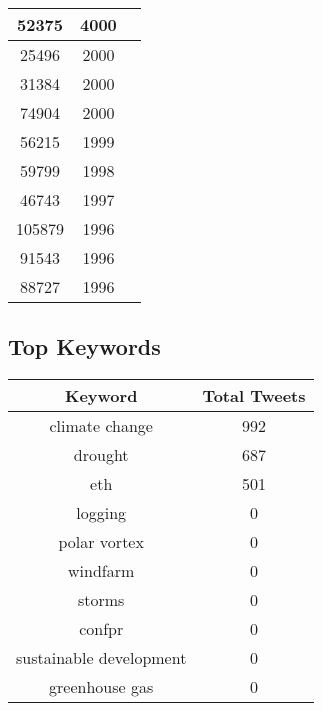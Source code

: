 \documentclass{article}\usepackage[T1]{fontenc}
\begin{document}
\begin{tabular}{|c|c|c|}
 \hline
52375 & 4000\\ 
 \hline
25496 & 2000\\ 
 \hline
31384 & 2000\\ 
 \hline
74904 & 2000\\ 
 \hline
56215 & 1999\\ 
 \hline
59799 & 1998\\ 
 \hline
46743 & 1997\\ 
 \hline
105879 & 1996\\ 
 \hline
91543 & 1996\\ 
 \hline
88727 & 1996\\ 
 \hline
\end{tabular}\subsection*{Top Keywords}\begin{tabular}{|c|c|}         \hline         Keyword & Total Tweets \\ 
 \hline
climate change & 992\\ 
 \hline
drought & 687\\ 
 \hline
eth & 501\\ 
 \hline
logging & 0\\ 
 \hline
polar vortex & 0\\ 
 \hline
windfarm & 0\\ 
 \hline
storms & 0\\ 
 \hline
confpr & 0\\ 
 \hline
sustainable development & 0\\ 
 \hline
greenhouse gas & 0\\ 
 \hline
\end{tabular}
\end{document}
